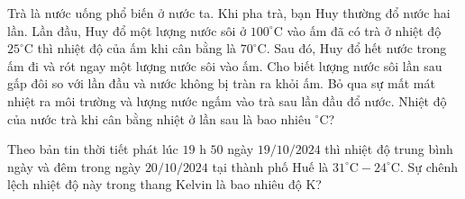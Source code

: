 \begin{ex}
	Trà là nước uống phổ biến ở nước ta. Khi pha trà, bạn Huy thường đổ nước hai lần. Lần đầu, Huy đổ một lượng nước sôi ở $100^\circ\text{C}$ vào ấm đã có trà ở nhiệt độ $25^\circ\text{C}$ thì nhiệt độ của ấm khi cân bằng là $70^\circ\text{C}$. Sau đó, Huy đổ hết nước trong ấm đi và rót ngay một lượng nước sôi vào ấm. Cho biết lượng nước sôi lần sau gấp đôi so với lần đầu và nước không bị tràn ra khỏi ấm. Bỏ qua sự mất mát nhiệt ra môi trường và lượng nước ngấm vào trà sau lần đầu đổ nước. Nhiệt độ của nước trà khi cân bằng nhiệt ở lần sau là bao nhiêu $^\circ\text{C}$?

	\par{}
\end{ex}

\begin{ex}
	Theo bản tin thời tiết phát lúc $19\text{ h } 50$ ngày $19/10/2024$ thì nhiệt độ trung bình ngày và đêm trong ngày $20/10/2024$ tại thành phố Huế là $31^\circ\text{C} - 24^\circ\text{C}$. Sự chênh lệch nhiệt độ này trong thang Kelvin là bao nhiêu độ $\text{K}$?

	\par{}
\end{ex}

